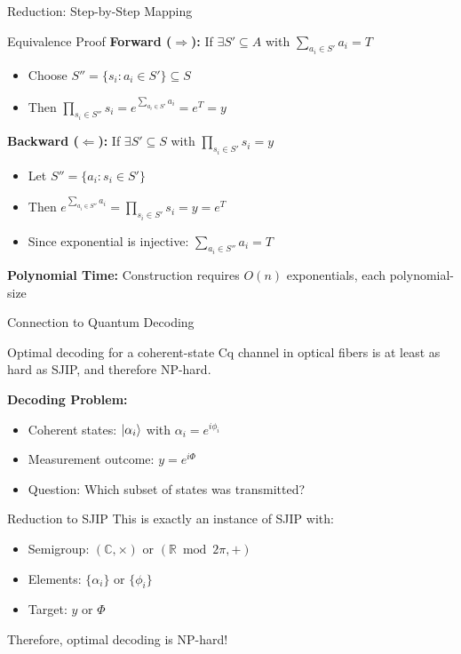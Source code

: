 \documentclass[aspectratio=169,12pt]{beamer}
\begin{document}
\begin{frame}{Reduction: Step-by-Step Mapping}
\begin{alertblock}{Equivalence Proof}
\textbf{Forward ($\Rightarrow$):} If $\exists S' \subseteq A$ with $\sum_{a_i \in S'} a_i = T$
\begin{itemize}
\item Choose $S'' = \{s_i : a_i \in S'\} \subseteq S$
\item Then $\prod_{s_i \in S''} s_i = e^{\sum_{a_i \in S'} a_i} = e^T = y$ \checkmark
\end{itemize}

\vspace{0.3cm}

\textbf{Backward ($\Leftarrow$):} If $\exists S' \subseteq S$ with $\prod_{s_i \in S'} s_i = y$
\begin{itemize}
\item Let $S'' = \{a_i : s_i \in S'\}$
\item Then $e^{\sum_{a_i \in S''} a_i} = \prod_{s_i \in S'} s_i = y = e^T$
\item Since exponential is injective: $\sum_{a_i \in S''} a_i = T$ \checkmark
\end{itemize}
\end{alertblock}

\vspace{0.3cm}

\textbf{Polynomial Time:} Construction requires $O(n)$ exponentials, each polynomial-size
\end{frame}

\begin{frame}{Connection to Quantum Decoding}
\begin{theorem}
Optimal decoding for a coherent-state Cq channel in optical fibers is at least as hard as SJIP, and therefore NP-hard.
\end{theorem}

\vspace{0.3cm}

\textbf{Decoding Problem:}
\begin{itemize}
\item Coherent states: $\ket{\alpha_i}$ with $\alpha_i = e^{i\phi_i}$
\item Measurement outcome: $y = e^{i\Phi}$
\item Question: Which subset of states was transmitted?
\end{itemize}

\vspace{0.3cm}

\begin{alertblock}{Reduction to SJIP}
This is exactly an instance of SJIP with:
\begin{itemize}
\item Semigroup: $(\mathbb{C}, \times)$ or $(\mathbb{R} \bmod 2\pi, +)$
\item Elements: $\{\alpha_i\}$ or $\{\phi_i\}$
\item Target: $y$ or $\Phi$
\end{itemize}
Therefore, optimal decoding is NP-hard!
\end{alertblock}
\end{frame}
\end{document}
